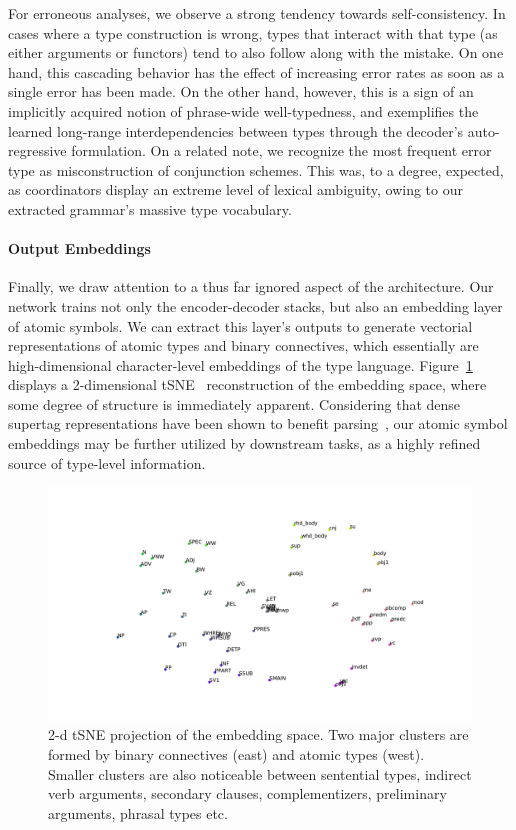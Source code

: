 For erroneous analyses, we observe a strong tendency towards self-consistency.
In cases where a type construction is wrong, types that interact with that type (as either arguments or functors) tend to also follow along with the mistake.
On one hand, this cascading behavior has the effect of increasing error rates as soon as a single error has been made.
On the other hand, however, this is a sign of an implicitly acquired notion of phrase-wide well-typedness, and exemplifies the learned long-range interdependencies between types through the decoder's auto-regressive formulation.
On a related note, we recognize the most frequent error type as misconstruction of conjunction schemes. 
This was, to a degree, expected, as coordinators display an extreme level of lexical ambiguity, owing to our extracted grammar's massive type vocabulary. 

\paragraph{Output Embeddings}
Finally, we draw  attention to a thus far ignored aspect of the architecture. 
Our network trains not only the encoder-decoder stacks, but also an embedding layer of atomic symbols.
We can extract this layer's outputs to generate vectorial representations of atomic types and binary connectives, which essentially are high-dimensional character-level embeddings of the type language.
Figure~\ref{fig:symbol_tsne} displays a 2-dimensional tSNE~\cite{maaten2008visualizing} reconstruction of the embedding space, where some degree of structure is immediately apparent.
Considering that dense supertag representations have been shown to benefit parsing~\cite{kasai-etal-2017-tag}, our atomic symbol embeddings may be further utilized by downstream tasks, as a highly refined source of type-level information.

\begin{figure}
    \centering
    \hspace{-70pt}
    \includegraphics[scale=0.28]{Figures/cluster.pdf}
    \caption[tSNE of Atomic Symbol Embeddings]{2-d tSNE projection of the embedding space. Two major clusters are formed by binary connectives (east) and atomic types (west). Smaller clusters are also noticeable between sentential types, indirect verb arguments, secondary clauses, complementizers, preliminary arguments, phrasal types etc.}
    \label{fig:symbol_tsne}
\end{figure}

